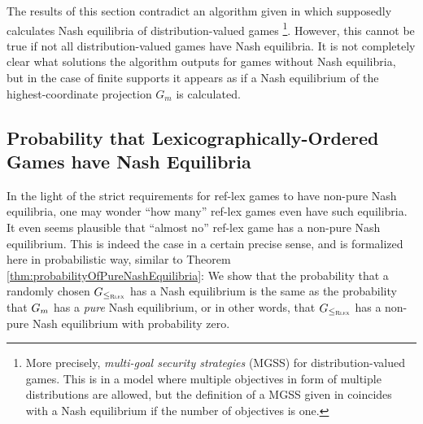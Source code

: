 \documentclass[a4paper,DIV=11]{scrreprt}
\theoremstyle{definition}
\begin{document}
    The results of this section contradict an algorithm given in \cite[Section 3.1]{bib:rassGameRiskManagII} which supposedly calculates Nash equilibria of distribution-valued games
    \footnote{More precisely, \emph{multi-goal security strategies} (MGSS) for distribution-valued games. This is in a model where multiple objectives in form of multiple distributions are allowed, but the definition of a MGSS given in \cite[Definition 4.1]{bib:rassGameRiskManagI} coincides with a Nash equilibrium if the number of objectives is one.}.
    However, this cannot be true if not all distribution-valued games have Nash equilibria.
    It is not completely clear what solutions the algorithm outputs for games without Nash equilibria, but in the case of finite supports it appears as if a Nash equilibrium of the highest-coordinate projection $G_m$ is calculated.

    
    \subsection{Probability that Lexicographically-Ordered Games have Nash Equilibria}
    
    In the light of the strict requirements for ref-lex games to have non-pure Nash equilibria, one may wonder “how many” ref-lex games even have such equilibria. 
    It even seems plausible that “almost no” ref-lex game has a non-pure Nash equilibrium.
    This is indeed the case in a certain precise sense, and is formalized here in probabilistic way, similar to Theorem \ref{thm:probabilityOfPureNashEquilibria}:
    We show that the probability that a randomly chosen $G_{\leq_{\textsc{Rlex}}}$ has a Nash equilibrium is the same as the probability that $G_{m}$ has a \emph{pure} Nash equilibrium, or in other words, that $G_{\leq_{\textsc{Rlex}}}$ has a non-pure Nash equilibrium with probability zero.
    
\end{document}
